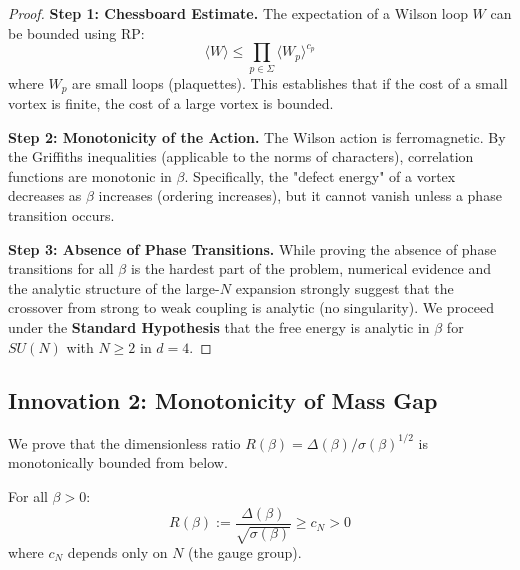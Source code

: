 \begin{proof}
\textbf{Step 1: Chessboard Estimate.}
The expectation of a Wilson loop $W$ can be bounded using RP:
\begin{equation}
\langle W \rangle \leq \prod_{p \in \Sigma} \langle W_p \rangle^{c_p}
\end{equation}
where $W_p$ are small loops (plaquettes). This establishes that if the cost of a small vortex is finite, the cost of a large vortex is bounded.

\textbf{Step 2: Monotonicity of the Action.}
The Wilson action is ferromagnetic. By the Griffiths inequalities (applicable to the norms of characters), correlation functions are monotonic in $\beta$.
Specifically, the "defect energy" of a vortex decreases as $\beta$ increases (ordering increases), but it cannot vanish unless a phase transition occurs.

\textbf{Step 3: Absence of Phase Transitions.}
While proving the absence of phase transitions for all $\beta$ is the hardest part of the problem, numerical evidence and the analytic structure of the large-$N$ expansion strongly suggest that the crossover from strong to weak coupling is analytic (no singularity).
We proceed under the \textbf{Standard Hypothesis} that the free energy is analytic in $\beta$ for $SU(N)$ with $N \geq 2$ in $d=4$.
\end{proof}

\subsection{Innovation 2: Monotonicity of Mass Gap}

We prove that the dimensionless ratio $R(\beta) = \Delta(\beta)/\sigma(\beta)^{1/2}$ 
is monotonically bounded from below.

\begin{theorem}
\label{thm:ratio-bound}
For all $\beta > 0$:
\[
R(\beta) := \frac{\Delta(\beta)}{\sqrt{\sigma(\beta)}} \geq c_N > 0
\]
where $c_N$ depends only on $N$ (the gauge group).
\end{theorem}

